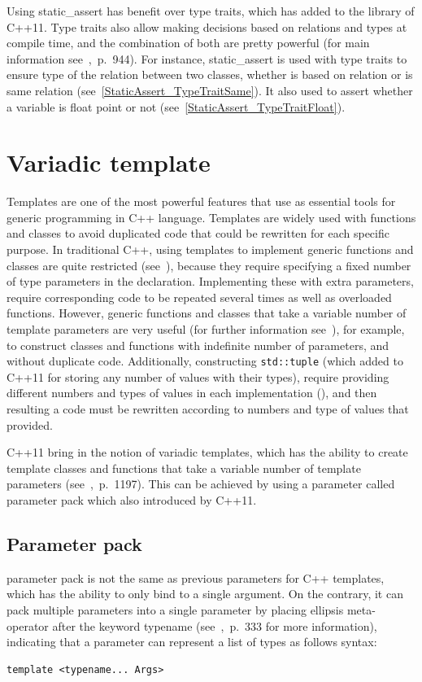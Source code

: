 \documentclass[11pt]{report}
\begin{document}
Using static\_assert has benefit over type traits, which has added to the library of C++11. Type traits also allow making decisions based on relations and types at compile time, and the combination of both are pretty powerful (for main information see~\cite{Gregorie:professionalcpp},~p.~944). For instance, static\_assert is used with type traits to ensure type of the relation between two classes, whether is based on relation or is same relation (see~\ref{StaticAssert_TypeTraitSame}). It also used to assert whether a variable is float point or not (see~\ref{StaticAssert_TypeTraitFloat}).

\section{Variadic template}
\label{section: Variadic template}
Templates are one of the most powerful features that use as essential tools for generic programming in C++ language. Templates are widely used with functions and classes to avoid duplicated code that could be rewritten for each specific purpose. In traditional C++, using templates to implement generic functions and classes are quite restricted (see~\cite{Stroustrup:2012:Cpp11}), because they require specifying a fixed number of type parameters in the declaration. Implementing these with extra parameters, require corresponding code to be repeated several times as well as overloaded functions. However, generic functions and classes that take a variable number of template parameters are very useful (for further information see~\cite{Gregor:2007:VTC}), for example, to construct classes and functions with indefinite number of parameters, and without duplicate code. Additionally, constructing \texttt{std::tuple} (which added to C++11 for storing any number of values with their types), require providing different numbers and types of values in each implementation (\cite{Gregor:2007:VTC}), and then resulting a code must be rewritten according to numbers and type of values that provided.

C++11 bring in the notion of variadic templates, which has the ability to create template classes and functions that take a variable number of template parameters (see~\cite{Prata:2012:Cpp},~p.~1197). This can be achieved by using a parameter called parameter pack which also introduced by C++11.

\subsection{Parameter pack}
\label{subsection: Parameter pack}
parameter pack is not the same as previous parameters for C++ templates, which has the ability to only bind to a single argument. On the contrary, it can pack multiple parameters into a single parameter by placing ellipsis meta-operator after the keyword typename (see~\cite{Prata:2012:Cpp},~p.~333 for more information), indicating that a parameter can represent a list of types as follows syntax:
\begin{lstlisting}
template <typename... Args>
\end{lstlisting}
\end{document}
